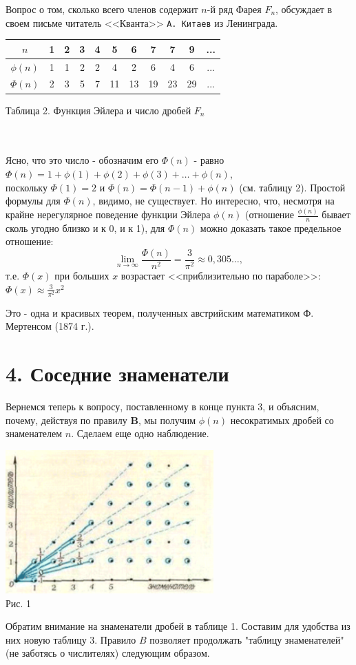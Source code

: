 \begin{multicols*}{2}
{Вопрос о том, сколько всего членов содержит $n$-й ряд Фарея $F_n$, обсуждает в своем письме читатель <<Кванта>> \texttt{А. Китаев} из Ленинграда.\columnbreak
\begin{center}
\begin{tabular}{|c|cccccccccc|}
\hline
$n$&1&2&3&4&5&6&7&7&9&...\\
\hline
$\phi(n)$&1&1&2&2&4&2&6&4&6&...\\
\hline
$\Phi(n)$&2&3&5&7&11&13&19&23&29&...\\
\hline
\end{tabular}
\end{center}
\caption{Таблица 2. Функция Эйлера и число дробей $F_n$}\\\\Ясно, что это число - обозначим его $\Phi(n)$ - равно\\
$\Phi(n) = 1+\phi(1)+\phi(2)+\phi(3)+\dots+\phi(n)$,\\поскольку $\Phi(1) = 2$ и $\Phi(n) = \Phi(n-1)+\phi(n)$ (см. таблицу 2). Простой формулы для $\Phi(n)$, видимо, не существует. Но интересно, что, несмотря на крайне нерегулярное поведение функции Эйлера $\phi(n)$ (отношение $\displaystyle\frac{\phi(n)}{n}$ бывает сколь угодно близко и к 0, и к 1), для $\Phi(n)$ можно доказать такое предельное отношение:
\[
\lim_{n \to \infty}\frac{\Phi(n)}{n^2} = \frac{3}{\pi^2} \approx 0{,}305\dots,
\]
т.е. $\Phi(x)$ при больших $x$ возрастает <<приблизительно по параболе>>: $\displaystyle \Phi(x) \approx \frac{3}{\pi^2}x^2$

Это - одна и красивых теорем, полученных австрийским математиком Ф. Мертенсом (1874 г.).
}
\section*{4. Соседние знаменатели}
{\large
Вернемся теперь к вопросу, поставленному в конце пункта 3, и объясним, почему, действуя по правилу \textbf{B}, мы получим $\phi(n)$ несократимых дробей со знаменателем $n$. Сделаем еще одно наблюдение.

\begin{center}
\includegraphics[width=8cm]{risunok.png}\\
\caption{Рис. 1}
\end{center}

Обратим внимание на знаменатели дробей в таблице 1. Составим для удобства из них новую таблицу 3. Правило $B$ позволяет продолжать "таблицу знаменателей" (не заботясь о числителях) следующим образом.
}
\end{multicols*}